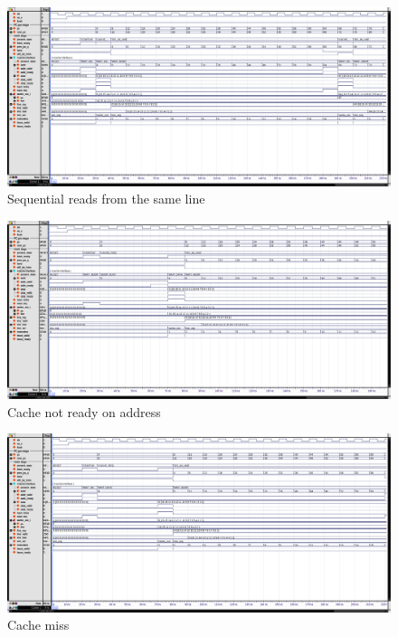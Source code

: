 \begin{figure}
  \centering
  \includegraphics[width=\textheight]{img/fetch01_conv.png}
  \caption{Sequential reads from the same line}
  \label{fig:fetch01_conv}
\end{figure}
\begin{figure}
  \centering
  \includegraphics[width=\textheight]{img/fetch02_address_conv.png}
  \caption{Cache not ready on address}
  \label{fig:fetch02_address_conv}
\end{figure}
\begin{figure}
  \centering
  \includegraphics[width=\textheight]{img/fetch02_miss_conv.png}
  \caption{Cache miss}
  \label{fig:fetch02_miss_conv}
\end{figure}
